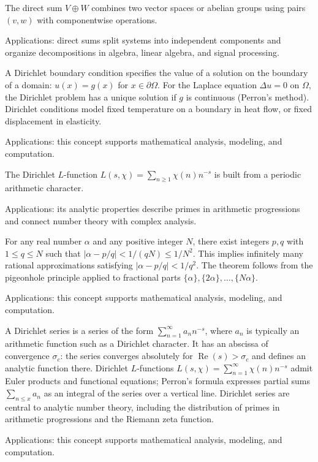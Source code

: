 The direct sum $V\oplus W$ combines two vector spaces or abelian groups using pairs $(v,w)$ with componentwise operations. \par\noindent Applications: direct sums split systems into independent components and organize decompositions in algebra, linear algebra, and signal processing.

A Dirichlet boundary condition specifies the value of a solution on the boundary of a domain: $u(x) = g(x)$ for $x \in \partial\Omega$. For the Laplace equation $\Delta u = 0$ on $\Omega$, the Dirichlet problem has a unique solution if $g$ is continuous (Perron's method). Dirichlet conditions model fixed temperature on a boundary in heat flow, or fixed displacement in elasticity. \par\noindent Applications: this concept supports mathematical analysis, modeling, and computation.

The Dirichlet $L$-function $L(s,\chi)=\sum_{n\ge1}\chi(n)n^{-s}$ is built from a periodic arithmetic character. \par\noindent Applications: its analytic properties describe primes in arithmetic progressions and connect number theory with complex analysis.

For any real number $\alpha$ and any positive integer $N$, there exist integers $p, q$ with $1 \leq q \leq N$ such that $|\alpha - p/q| < 1/(qN) \leq 1/N^2$. This implies infinitely many rational approximations satisfying $|\alpha - p/q| < 1/q^2$. The theorem follows from the pigeonhole principle applied to fractional parts $\{\alpha\}, \{2\alpha\}, \ldots, \{N\alpha\}$. \par\noindent Applications: this concept supports mathematical analysis, modeling, and computation.

A Dirichlet series is a series of the form $\sum_{n=1}^{\infty} a_n n^{-s}$, where $a_n$ is typically an arithmetic function such as a Dirichlet character. It has an abscissa of convergence $\sigma_c$: the series converges absolutely for $\operatorname{Re}(s) > \sigma_c$ and defines an analytic function there. Dirichlet $L$-functions $L(s,\chi) = \sum_{n=1}^\infty \chi(n)n^{-s}$ admit Euler products and functional equations; Perron's formula expresses partial sums $\sum_{n \leq x} a_n$ as an integral of the series over a vertical line. Dirichlet series are central to analytic number theory, including the distribution of primes in arithmetic progressions and the Riemann zeta function. \par\noindent Applications: this concept supports mathematical analysis, modeling, and computation.

